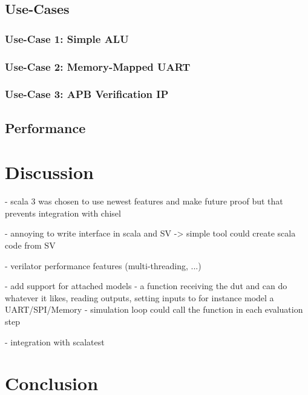 \documentclass[12pt]{report}
\begin{document}
\section{Use-Cases} %

\subsection{Use-Case 1: Simple ALU} %

\subsection{Use-Case 2: Memory-Mapped UART} %

\subsection{Use-Case 3: APB Verification IP} %

\section{Performance} %

\chapter{Discussion} %

- scala 3 was chosen to use newest features and make future proof but that prevents integration with chisel

- annoying to write interface in scala and SV -> simple tool could create scala code from SV


- verilator performance features (multi-threading, ...)

- add support for attached models
- a function receiving the dut and can do whatever it likes, reading outputs, setting inputs to for instance model a
UART/SPI/Memory
- simulation loop could call the function in each evaluation step

- integration with scalatest

\chapter{Conclusion} %

\printbibliography
\end{document}
